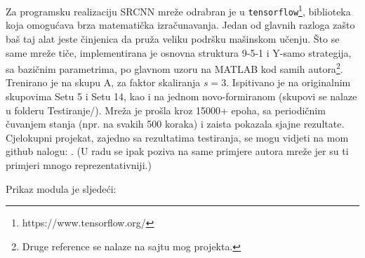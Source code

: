 \documentclass[12pt]{report}
\numberwithin{equation}{section}
\begin{document}
  Za programsku realizaciju SRCNN mreže odrabran je u \texttt{tensorflow}\footnote{https://www.tensorflow.org/}, biblioteka koja omogućava brza matematička izračunavanja. Jedan od glavnih razloga zašto baš taj alat jeste činjenica da pruža veliku podršku mašinskom učenju.
  Što se same mreže tiče, implementirana je osnovna struktura 9-5-1 i Y-samo strategija, sa bazičnim parametrima, po glavnom uzoru na MATLAB kod samih autora\footnote{Druge reference se nalaze na sajtu mog projekta.}. Trenirano je na skupu A, za faktor skaliranja $s=3$. Ispitivano je na originalnim skupovima Setu 5 i Setu 14, kao i na jednom novo-formiranom (skupovi se nalaze u folderu Testiranje/).  Mreža je prošla kroz 15000+ epoha, sa periodičnim čuvanjem stanja (npr. na svakih 500 koraka) i zaista pokazala sjajne rezultate. Cjelokupni projekat, zajedno sa rezultatima testiranja, se mogu vidjeti na mom github nalogu: \cite{samples}. (U radu se ipak poziva na same primjere autora mreže jer su ti primjeri mnogo reprezentativniji.)
    
 Prikaz modula je sljedeći:
  
\end{document}
